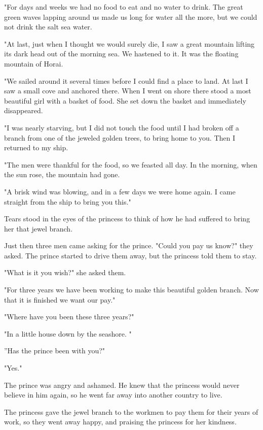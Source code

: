 \documentclass{article}
\begin{document}
"For days and weeks we had no food to eat and no water to drink. The great green waves lapping around us made us long for water all the more, but we could not drink the salt sea water.

"At last, just when I thought we would surely die, I saw a great mountain lifting its dark head out of the morning sea. We hastened to it. It was the floating mountain of Horai.

"We sailed around it several times before I could find a place to land. At last I saw a small cove and anchored there. When I went on shore there stood a most beautiful girl with a basket of food. She set down the basket and immediately disappeared.

"I was nearly starving, but I did not touch the food until I had broken off a branch from one of the jeweled golden trees, to bring home to you. Then I returned to my ship.

"The men were thankful for the food, so we feasted all day. In the morning, when the sun rose, the mountain had gone.

"A brisk wind was blowing, and in a few days we were home again. I came straight from the ship to bring you this."

Tears stood in the eyes of the princess to think of how he had suffered to bring her that jewel branch.

Just then three men came asking for the prince. "Could you pay us know?" they asked. The prince started to drive them away, but the princess told them to stay.

"What is it you wish?" she asked them.

"For three years we have been working to make this beautiful golden branch. Now that it is finished we want our pay."

"Where have you been these three years?"

"In a little house down by the seashore. "

''Has the prince been with you?"

"Yes."

The prince was angry and ashamed. He knew that the princess would never believe in him again, so he went far away into another country to live.

The princess gave the jewel branch to the workmen to pay them for their years of work, so they went away happy, and praising the princess for her kindness.
\end{document}
